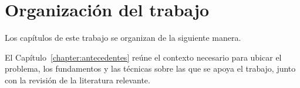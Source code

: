 
\section{Organización del trabajo}

Los capítulos de este trabajo se organizan de la siguiente manera.

El Capítulo~\ref{chapter:antecedentes} reúne el contexto necesario para ubicar el problema, los fundamentos y las técnicas sobre las que se apoya el trabajo, junto con la revisión de la literatura relevante.

